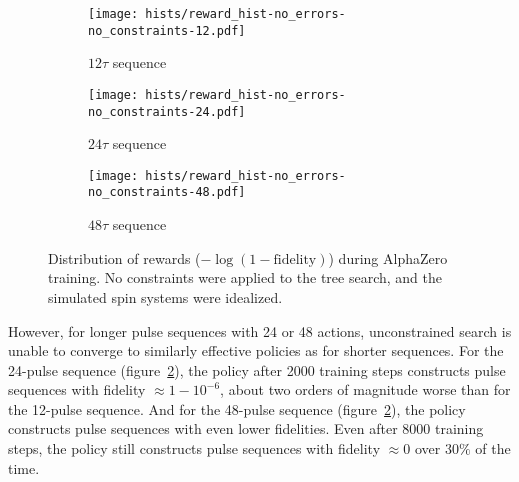 \begin{figure}[H]
    \centering
    \begin{subfigure}{.49\textwidth}
        \centering
        \texttt{[image: hists/reward\_hist-no\_errors-no\_constraints-12.pdf]}
        \caption{$12\tau$ sequence}
        \label{fig:reward_hist-no_errors-no_constraints-12}
    \end{subfigure}
    \begin{subfigure}{.49\textwidth}
        \centering
        \texttt{[image: hists/reward\_hist-no\_errors-no\_constraints-24.pdf]}
        \caption{$24\tau$ sequence}
        \label{fig:reward_hist-no_errors-no_constraints-24}
    \end{subfigure}
    \begin{subfigure}{.49\textwidth}
        \centering
        \texttt{[image: hists/reward\_hist-no\_errors-no\_constraints-48.pdf]}
        \caption{$48\tau$ sequence}
        \label{fig:reward_hist-no_errors-no_constraints-48}
    \end{subfigure}
    \caption{Distribution of rewards ($-\log(1 - \text{fidelity})$) during AlphaZero training. No constraints were applied to the tree search, and the simulated spin systems were idealized.}
    \label{fig:reward_hist-no_errors-no_constraints}
\end{figure}

However, for longer pulse sequences with 24 or 48 actions, unconstrained search is unable to converge to similarly effective policies as for shorter sequences. For the 24-pulse sequence (figure~\ref{fig:reward_hist-no_errors-no_constraints-24}), the policy after 2000 training steps constructs pulse sequences with fidelity $\approx 1 - 10^{-6}$, about two orders of magnitude worse than for the 12-pulse sequence.
And for the 48-pulse sequence (figure~\ref{fig:reward_hist-no_errors-no_constraints-24}), the policy constructs pulse sequences with even lower fidelities. Even after 8000 training steps, the policy still constructs pulse sequences with fidelity $\approx 0$ over $30\%$ of the time.

